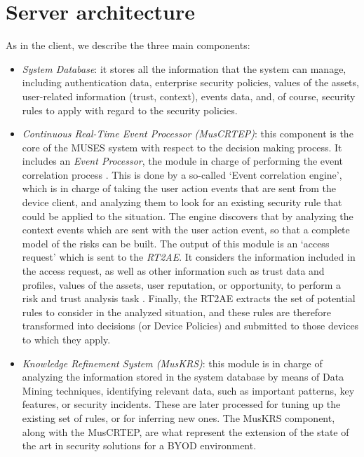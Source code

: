 
\section{Server architecture}

As in the client, we describe the three main components:
\begin{itemize}
	 \item \textit{System Database}: it stores all the information that the system can manage, including authentication data, enterprise security policies, values of the assets, user-related information (trust, context), events data, and, of course, security rules to apply with regard to the security policies.

	 \item \textit{Continuous Real-Time Event Processor (MusCRTEP)}: this component is the core of the MUSES system with respect to the decision making process. It includes an \textit{Event Processor}, the module in charge of performing the event correlation process \cite{deliverable21, deliverable52}. This is done by a so-called `Event correlation engine', which is in charge of taking the user action events that are sent from the device client, and analyzing them to look for an existing security rule that could be applied to the situation. The engine discovers that by analyzing the context events which are sent with the user action event, so that a complete model of the risks can be built. The output of this module is an `access request' which is sent to the \textit{RT2AE}. It considers the information included in the access request, as well as other information such as trust data and profiles, values of the assets, user reputation, or opportunity, to perform a risk and trust analysis task \cite{RT2AE_SOTICS13}. Finally, the RT2AE extracts the set of potential rules to consider in the analyzed situation, and these rules are therefore transformed into decisions (or Device Policies) and submitted to those devices to which they apply.

	 \item \textit{Knowledge Refinement System (MusKRS)}: this module is in charge of analyzing the information stored in the system database by means of Data Mining techniques, identifying relevant data, such as important patterns, key features, or security incidents. These are later processed for tuning up the existing set of rules, or for inferring new ones. The MusKRS component, along with the MusCRTEP, are what represent the extension of the state of the art in security solutions for a BYOD environment. 

\end{itemize}

